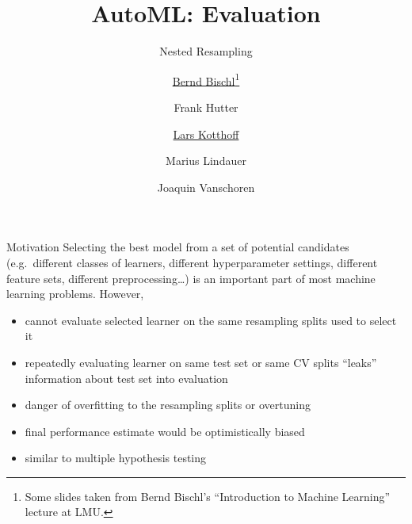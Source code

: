




\title[AutoML: Risks]{AutoML: Evaluation} %
\subtitle{Nested Resampling} %
\author[Lars Kotthoff]{\underline{Bernd Bischl}\footnote{Some slides taken from Bernd Bischl's ``Introduction to Machine Learning'' lecture at LMU.  %
} \and Frank Hutter \and \underline{Lars Kotthoff}\newline \and Marius Lindauer \and Joaquin Vanschoren}
\institute{}
\date{}

\newcommand\reffootnote[1]{%
    \begingroup
    \renewcommand\thefootnote{}\footnote{
        \tiny #1
    \vspace*{1em}}%
    \addtocounter{footnote}{-1}%
    \endgroup
}



	
	\maketitle

    \begin{frame}[c]{Motivation}
    Selecting the best model from a set of potential candidates (e.g.\ different classes of learners, different hyperparameter settings, different feature sets, different preprocessing\ldots) is an important part of most  machine learning problems.
    However,

    \begin{itemize}
        \item cannot evaluate selected learner on the same
            resampling splits used to select it
        \item repeatedly evaluating learner on same test set or same CV splits
            ``leaks'' information about test set into evaluation
        \item danger of overfitting to the resampling splits or overtuning
        \item final performance estimate would be optimistically biased
        \item similar to multiple hypothesis testing
    \end{itemize}
    \end{frame}

